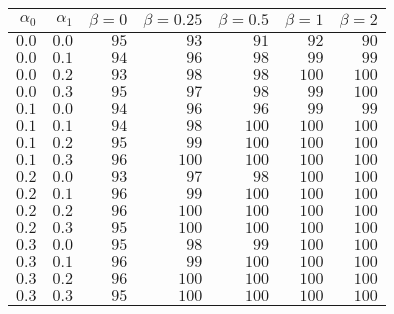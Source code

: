 \begin{tabular}{rr|rrrrr}
\hline\hline
 $\alpha_0$ & $\alpha_1$ & $\beta=0$ & $\beta=0.25$ & $\beta=0.5$ & $\beta=1$ & $\beta=2$ \\ 
 \hline
$0.0$ & $0.0$ & $95$ & $ 93$ & $ 91$ & $ 92$ & $ 90$\\ 
$0.0$ & $0.1$ & $94$ & $ 96$ & $ 98$ & $ 99$ & $ 99$\\ 
$0.0$ & $0.2$ & $93$ & $ 98$ & $ 98$ & $100$ & $100$\\ 
$0.0$ & $0.3$ & $95$ & $ 97$ & $ 98$ & $ 99$ & $100$\\ 
$0.1$ & $0.0$ & $94$ & $ 96$ & $ 96$ & $ 99$ & $ 99$\\ 
$0.1$ & $0.1$ & $94$ & $ 98$ & $100$ & $100$ & $100$\\ 
$0.1$ & $0.2$ & $95$ & $ 99$ & $100$ & $100$ & $100$\\ 
$0.1$ & $0.3$ & $96$ & $100$ & $100$ & $100$ & $100$\\ 
$0.2$ & $0.0$ & $93$ & $ 97$ & $ 98$ & $100$ & $100$\\ 
$0.2$ & $0.1$ & $96$ & $ 99$ & $100$ & $100$ & $100$\\ 
$0.2$ & $0.2$ & $96$ & $100$ & $100$ & $100$ & $100$\\ 
$0.2$ & $0.3$ & $95$ & $100$ & $100$ & $100$ & $100$\\ 
$0.3$ & $0.0$ & $95$ & $ 98$ & $ 99$ & $100$ & $100$\\ 
$0.3$ & $0.1$ & $96$ & $ 99$ & $100$ & $100$ & $100$\\ 
$0.3$ & $0.2$ & $96$ & $100$ & $100$ & $100$ & $100$\\ 
$0.3$ & $0.3$ & $95$ & $100$ & $100$ & $100$ & $100$\\ 
 \hline 
 \end{tabular}
